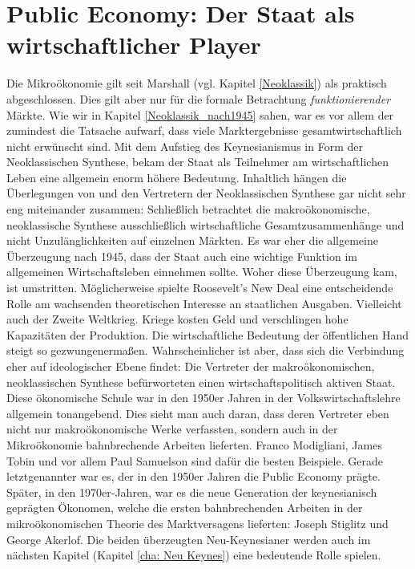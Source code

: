 %
%
%

\chapter{Public Economy: Der Staat als wirtschaftlicher Player}
\label{cha: Marktversagen}

Die Mikroökonomie gilt seit Marshall (vgl. Kapitel \ref{Neoklassik}) als praktisch abgeschlossen. Dies gilt aber nur für die formale Betrachtung \textit{funktionierender} Märkte. Wie wir in Kapitel \ref{Neoklassik_nach1945} sahen, war es vor allem \textcite{Pigou1920} der zumindest die Tatsache aufwarf, dass viele Marktergebnisse gesamtwirtschaftlich nicht erwünscht sind. Mit dem Aufstieg des Keynesianismus in Form der Neoklassischen Synthese, bekam der Staat als Teilnehmer am wirtschaftlichen Leben eine allgemein enorm höhere Bedeutung. Inhaltlich hängen die Überlegungen von \textcite{Pigou1920} und den Vertretern der Neoklassischen Synthese gar nicht sehr eng miteinander zusammen: Schließlich betrachtet die makroökonomische, neoklassische Synthese ausschließlich wirtschaftliche Gesamtzusammenhänge und nicht Unzulänglichkeiten auf einzelnen Märkten. Es war eher die allgemeine Überzeugung nach 1945, dass der Staat auch eine wichtige Funktion im allgemeinen Wirtschaftsleben einnehmen sollte. Woher diese Überzeugung kam, ist umstritten. Möglicherweise spielte Roosevelt's New Deal eine entscheidende Rolle am wachsenden theoretischen Interesse an staatlichen Ausgaben. Vielleicht auch der Zweite Weltkrieg. Kriege kosten Geld und verschlingen hohe Kapazitäten der Produktion. Die wirtschaftliche Bedeutung der öffentlichen Hand steigt so gezwungenermaßen. Wahrscheinlicher ist aber, dass sich die Verbindung eher auf ideologischer Ebene findet: Die Vertreter der makroökonomischen, neoklassischen Synthese befürworteten einen wirtschaftspolitisch aktiven Staat. Diese ökonomische Schule war in den 1950er Jahren in der Volkswirtschaftslehre allgemein tonangebend. Dies sieht man auch daran, dass deren Vertreter eben nicht nur makroökonomische Werke verfassten, sondern auch in der Mikroökonomie bahnbrechende Arbeiten lieferten. Franco Modigliani, James Tobin und vor allem Paul Samuelson sind dafür die besten Beispiele. Gerade letztgenannter war es, der in den 1950er Jahren die Public Economy prägte. Später, in den 1970er-Jahren, war es die neue Generation der keynesianisch geprägten Ökonomen, welche die ersten bahnbrechenden Arbeiten in der mikroökonomischen Theorie des Marktversagens lieferten: Joseph Stiglitz und George Akerlof. Die beiden überzeugten Neu-Keynesianer werden auch im nächsten Kapitel (Kapitel \ref{cha: Neu Keynes}) eine bedeutende Rolle spielen.

